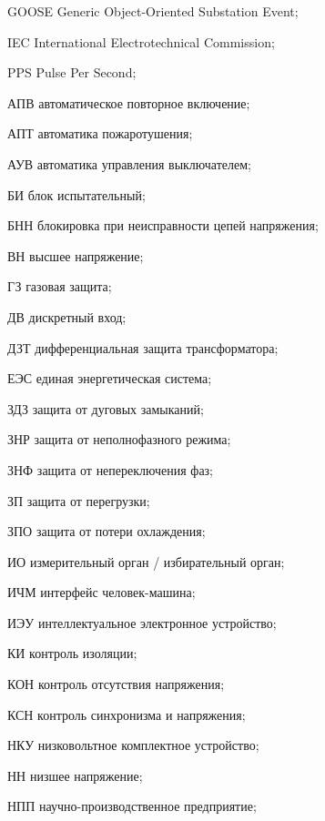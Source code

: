 \begin{list}{}%
{%
  \setlength{\labelwidth}{\abbrwidth}%
  \setlength{\labelsep}{0pt}%
  \setlength{\leftmargin}{\dimexpr\labelwidth+\labelsep\relax}%
  \setlength{\itemindent}{0pt}%
  \setlength{\parsep}{0pt}%
  \setlength{\itemsep}{0pt}
  \renewcommand{\makelabel}[1]{#1 --\hspace{\abbrgap}}%
}
\item[GOOSE] Generic Object-Oriented Substation Event;
\item[IEC]  International Electrotechnical Commission;
\item[PPS] Pulse Per Second;
\item[АПВ] автоматическое повторное включение;
\item[АПТ] автоматика пожаротушения;
\item[АУВ] автоматика управления выключателем;
\item[БИ] блок испытательный;
\item[БНН] блокировка при неисправности цепей напряжения;
\item[ВН] высшее напряжение;
\item[ГЗ] газовая защита;
\item[ДВ] дискретный вход;
\item[ДЗТ] дифференциальная защита трансформатора;
\item[ЕЭС] единая энергетическая система;
\item[ЗДЗ] защита от дуговых замыканий;
\item[ЗНР] защита от неполнофазного режима;
\item[ЗНФ] защита от непереключения фаз;
\item[ЗП] защита от перегрузки;
\item[ЗПО] защита от потери охлаждения;
\item[ИО] измерительный орган / избирательный орган;
\item[ИЧМ] интерфейс человек-машина;
\item[ИЭУ] интеллектуальное электронное устройство;
\item[КИ] контроль изоляции;
\item[КОН] контроль отсутствия напряжения;
\item[КСН] контроль синхронизма и напряжения;
\item[НКУ] низковольтное комплектное устройство;
\item[НН] низшее напряжение;
\item[НПП] научно-производственное предприятие;

\end{list}
